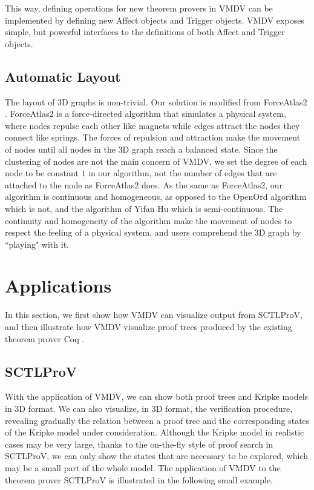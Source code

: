 \documentclass[runningheads]{llncs}
\newcommand\tool[1]{\textsf{#1}}
\newcommand\vmdv{\tool{VMDV}}
\begin{document}
This way, defining operations for new theorem provers in \vmdv{} can be implemented by defining new \textsf{Affect} objects and \textsf{Trigger} objects. \vmdv{} exposes simple, but powerful interfaces to the definitions of both \textsf{Affect} and \textsf{Trigger} objects.
 
 
\subsection{Automatic Layout}
The layout of 3D graphs is non-trivial. Our solution is modified from ForceAtlas2 \cite{jacomy2014forceatlas2}. ForceAtlas2 is a force-directed algorithm that simulates a physical system, where nodes repulse each other like magnets while edges attract the nodes they connect like springs. The forces of repulsion and attraction make the movement of nodes until all nodes in the 3D graph reach a balanced state. Since the clustering of nodes are not the main concern of \textsf{VMDV}, we set the degree of each node to be constant $1$ in our algorithm, not the number of edges that are attached to the node as ForceAtlas2 does. As the same as ForceAtlas2, our algorithm is continuous and homogeneous, as opposed to the OpenOrd \cite{martin2011openord} algorithm which is not, and the algorithm of Yifan Hu \cite{yifanhu05} which is semi-continuous. The continuity and homogeneity of the algorithm make the movement of nodes to respect the feeling of a physical system, and users comprehend the 3D graph by ``playing" with it.
 

\section{Applications}
In this section, we first show how \vmdv{} can visualize output from \textsf{SCTLProV}, and then illustrate how \vmdv{} visualize proof trees produced by the existing theorem prover Coq \cite{bertot2013interactive}.
 
\subsection{\textsf{SCTLProV}}
With the application of \textsf{VMDV}, we can show both proof trees and Kripke models in 3D format.
We can also visualize, in 3D format, the verification procedure,
revealing gradually the relation between a proof tree and the corresponding states of the Kripke model under consideration.
Although the Kripke model in realistic cases may be very large, thanks to the on-the-fly style of proof search in \textsf{SCTLProV}, we can only show the states that are necessary to be explored, which may be a small part of the whole model.
The application of \vmdv{} to the theorem prover \textsf{SCTLProV} is illustrated in the following small example.
 
\end{document}
